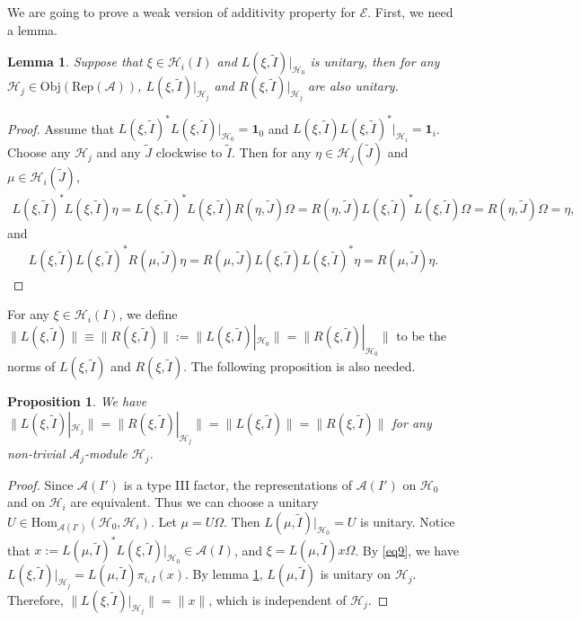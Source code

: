 \documentclass[11pt,b5paper,notitlepage]{article}
\theoremstyle{definition}
\theoremstyle{plain}
\newtheorem{pp}[df]{Proposition}
\newtheorem{lm}[df]{Lemma}
\newcommand{\mc}{\mathcal}
\newcommand{\wtd}{\widetilde}
\newcommand{\id}{\mathbf{1}}
\newcommand{\Hom}{\mathrm{Hom}}
\newcommand{\scr}{\mathscr}
\newcommand{\RepA}{\mathrm{Rep}(\mc A)}
\newcommand{\Obj}{\mathrm{Obj}}
\numberwithin{equation}{subsection}
\begin{document}
We are going to prove a weak version of additivity property for $\scr E$. First, we need a lemma.

\begin{lm}\label{lb6}
	Suppose that $\xi\in\mc H_i(I)$ and $L(\xi,\wtd I)|_{\mc H_0}$ is unitary, then for any $\mc H_j\in\Obj(\RepA)$, $L(\xi,\wtd I)|_{\mc H_j}$ and $R(\xi,\wtd I)|_{\mc H_j}$ are also unitary.
\end{lm}


\begin{proof}
	Assume that $L(\xi,\wtd I)^*L(\xi,\wtd I)|_{\mc H_0}=\id_0$ and  $L(\xi,\wtd I)L(\xi,\wtd I)^*|_{\mc H_i}=\id_i$. Choose any $\mc H_j$ and any $\wtd J$ clockwise to $\wtd I$. Then for any $\eta\in\mc H_j(\wtd J)$ and $\mu\in\mc H_i(\wtd J)$,
	\begin{align*}
	L(\xi,\wtd I)^*L(\xi,\wtd I)\eta=L(\xi,\wtd I)^*L(\xi,\wtd I)R(\eta,\wtd J)\Omega=R(\eta,\wtd J)L(\xi,\wtd I)^*L(\xi,\wtd I)\Omega=R(\eta,\wtd J)\Omega=\eta,
	\end{align*}
	and 
	\begin{align*}
	L(\xi,\wtd I)L(\xi,\wtd I)^*R(\mu,\wtd J)\eta=R(\mu,\wtd J)L(\xi,\wtd I)L(\xi,\wtd I)^*\eta=R(\mu,\wtd J)\eta.
	\end{align*}
\end{proof}

For any $\xi\in\mc H_i(I)$, we define $\lVert L(\xi,\wtd I) \lVert\equiv \lVert R(\xi,\wtd I) \lVert:=\lVert L(\xi,\wtd I)|_{\mc H_0} \lVert=\lVert R(\xi,\wtd I)|_{\mc H_0} \lVert$ to be the norms of $L(\xi,\wtd I)$ and $R(\xi,\wtd I)$.  \index{Lxi@$\lVert L(\xi,\wtd I) \lVert=\lVert R(\xi,\wtd I) \lVert$} The following proposition is also needed.


\begin{pp}\label{lb20}
We have $\lVert L(\xi,\wtd I)|_{\mc H_j} \lVert=\lVert R(\xi,\wtd I)|_{\mc H_j} \lVert=\lVert L(\xi,\wtd I)\lVert=\lVert R(\xi,\wtd I)\lVert$ for any non-trivial $\mc A_j$-module $\mc H_j$.
\end{pp}
\begin{proof}
Since $\mc A(I')$ is a type III factor, the representations of $\mc A(I')$ on $\mc H_0$ and on $\mc H_i$ are equivalent. Thus we can choose a unitary $U\in\Hom_{\mc A(I')}(\mc H_0,\mc H_i)$. Let $\mu=U\Omega$. Then $L(\mu,\wtd I)|_{\mc H_0}=U$ is unitary. Notice that   $x:=L(\mu,\wtd I)^*L(\xi,\wtd I)|_{\mc H_0}\in\mc A(I)$, and $\xi=L(\mu,\wtd I)x\Omega$. By \eqref{eq9}, we have $L(\xi,\wtd I)|_{\mc H_j}=L(\mu,\wtd I)\pi_{i,I}(x)$. By lemma \ref{lb6}, $L(\mu,\wtd I)$ is unitary on  $\mc H_j$. Therefore, $\lVert L(\xi,\wtd I)|_{\mc H_j} \lVert=\lVert x\lVert$, which is independent of $\mc H_j$.
\end{proof}
\end{document}
